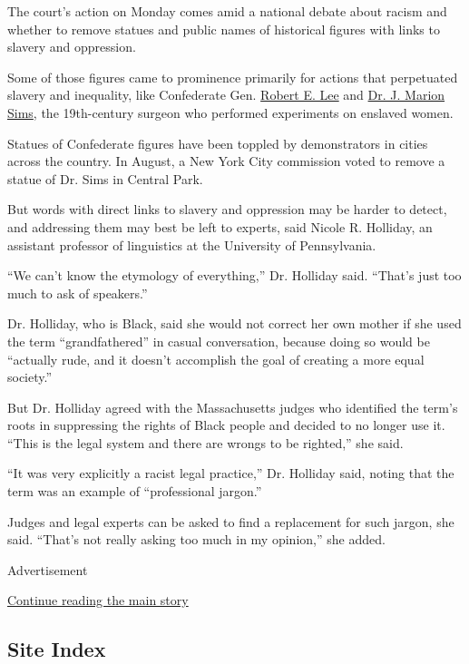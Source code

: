 The court's action on Monday comes amid a national debate about racism
and whether to remove statues and public names of historical figures
with links to slavery and oppression.

Some of those figures came to prominence primarily for actions that
perpetuated slavery and inequality, like Confederate Gen.
\href{https://www.nytimes3xbfgragh.onion/2020/06/18/us/confederate-statues-monuments-removal.html}{Robert
E. Lee} and
\href{https://www.nytimes3xbfgragh.onion/2018/04/16/nyregion/nyc-sims-statue-central-park-monument.html}{Dr.
J. Marion Sims}, the 19th-century surgeon who performed experiments on
enslaved women.

Statues of Confederate figures have been toppled by demonstrators in
cities across the country. In August, a New York City commission voted
to remove a statue of Dr. Sims in Central Park.

But words with direct links to slavery and oppression may be harder to
detect, and addressing them may best be left to experts, said Nicole R.
Holliday, an assistant professor of linguistics at the University of
Pennsylvania.

``We can't know the etymology of everything,'' Dr. Holliday said.
``That's just too much to ask of speakers.''

Dr. Holliday, who is Black, said she would not correct her own mother if
she used the term ``grandfathered'' in casual conversation, because
doing so would be ``actually rude, and it doesn't accomplish the goal of
creating a more equal society.''

But Dr. Holliday agreed with the Massachusetts judges who identified the
term's roots in suppressing the rights of Black people and decided to no
longer use it. ``This is the legal system and there are wrongs to be
righted,'' she said.

``It was very explicitly a racist legal practice,'' Dr. Holliday said,
noting that the term was an example of ``professional jargon.''

Judges and legal experts can be asked to find a replacement for such
jargon, she said. ``That's not really asking too much in my opinion,''
she added.

Advertisement

\protect\hyperlink{after-bottom}{Continue reading the main story}

\hypertarget{site-index}{%
\subsection{Site Index}\label{site-index}}


